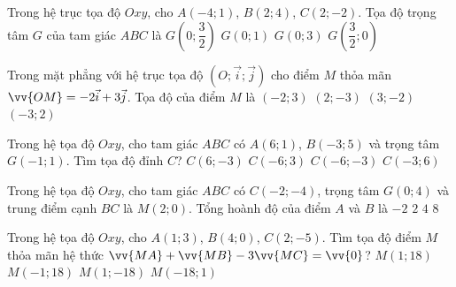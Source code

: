 \begin{ex}%
Trong hệ trục tọa độ $Oxy$, cho $A(-4 ; 1)$, $B(2 ; 4)$, $C(2 ;-2)$. Tọa độ trọng tâm $G$ của tam giác $ABC$ là
\choice
{$G\left(0 ; \dfrac{3}{2}\right)$}
{\True $G(0 ; 1)$}
{$G(0 ; 3)$}
{$G\left(\dfrac{3}{2} ; 0\right)$}
\end{ex}

\begin{ex}%
Trong mặt phẳng với hệ trục tọa độ $(O ; \vec{i} ; \vec{j})$ cho điểm $M$ thỏa mãn $\vv{O M}=-2 \vec{i}+3 \vec{j}$. Tọa độ của điểm $M$ là
\choice
{\True $(-2 ; 3)$}
{$(2 ;-3)$}
{$(3 ;-2)$}
{$(-3 ; 2)$}
\end{ex}

\begin{ex}%
Trong hệ tọa độ $Oxy$, cho tam giác $ABC$ có $A(6 ; 1)$, $B(-3 ; 5)$ và trọng tâm $G(-1 ; 1)$. Tìm tọa độ đỉnh $C$?
\choice
{$C(6 ;-3)$}
{$C(-6 ; 3)$}
{\True $C(-6 ;-3)$}
{$C(-3 ; 6)$}
\end{ex}

\begin{ex}%
Trong hệ tọa độ $Oxy$, cho tam giác $ABC$ có $C(-2 ;-4)$, trọng tâm $G(0 ; 4)$ và trung điểm cạnh $B C$ là $M(2 ; 0)$. Tổng hoành độ của điểm $A$ và $B$ là
\choice
{$ -2 $}
{\True $ 2 $}
{$ 4 $}
{$ 8 $}
\end{ex}

\begin{ex}%
Trong hệ tọa độ $Oxy$, cho $A(1 ; 3)$, $B(4 ; 0)$, $C(2 ;-5)$. Tìm tọa độ điểm $M$ thỏa mãn hệ thức $\vv{M A}+\vv{M B}-3 \vv{M C}=\vv{0}$?
\choice
{$M(1 ; 18)$}
{$M(-1 ; 18)$}
{\True $M(1 ;-18)$}
{$M(-18 ; 1)$}
\end{ex}

